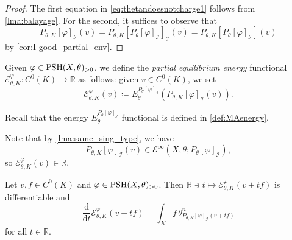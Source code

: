 \begin{proof}
The first equation in \eqref{eq:thetandoesnotcharge1} follows from \cref{lma:balayage}. For the second, it suffices to observe that
\[
P_{\theta,K}[\varphi]_{\mathcal{I}}(v)=P_{\theta,K}\left[P_{\theta}[\varphi]_{\mathcal{I}}\right]_{\mathcal{I}}(v)=P_{\theta,K}\left[P_{\theta}[\varphi]_{\mathcal{I}}\right](v)
\]
by \cref{cor:I-good_partial_env}.
\end{proof}


\begin{definition}\label{def:partialequienergy}
Given $\varphi\in \mathrm{PSH}(X,\theta)_{>0}$, we define the \emph{partial equilibrium energy} functional $\mathcal{E}_{\theta,K}^{\varphi}\colon C^0(K)\rightarrow \mathbb{R}$ as follows: given $v \in C^0(K)$, we set
\begin{equation}
\mathcal{E}_{\theta,K}^{\varphi}(v)\coloneqq E_{\theta}^{P_{\theta}[\varphi]_{\mathcal{I}}}\left(P_{\theta,K}[\varphi]_{\mathcal{I}}(v)\right).
\end{equation}
\end{definition}
Recall that the energy $E_{\theta}^{P_{\theta}[\varphi]_{\mathcal{I}}}$ functional is defined in \cref{def:MAenergy}.

Note that by \cref{lma:same_sing_type}, we have
\[
P_{\theta,K}[\varphi]_{\mathcal{I}}(v)\in \mathcal{E}^{\infty}\left(X,\theta;P_{\theta}[\varphi]_{\mathcal{I}}\right),
\]
so $\mathcal{E}_{\theta,K}^{\varphi}(v)\in \mathbb{R}$.


\begin{proposition}\label{prop:differential_P} Let $v,f \in C^0(K)$ and $\varphi \in \mathrm{PSH}(X,\theta)_{>0}$.
Then $\mathbb{R}\ni t \mapsto \mathcal{E}_{\theta,K}^{\varphi}(v+tf)$ is differentiable and
\begin{equation}\label{eq:ddtI}
\frac{\mathrm{d}}{\mathrm{d}t}\mathcal{E}_{\theta,K}^{\varphi}(v+tf) = \int_K f\, \theta^n_{P_{\theta,K}[\varphi]_{\mathcal{I}}(v+tf)}
\end{equation}
for all $t\in \mathbb{R}$.
\end{proposition}

